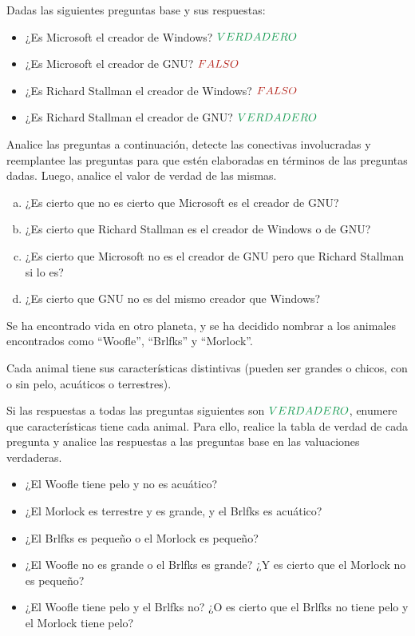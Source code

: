 \begin{exercise}
    Dadas las siguientes preguntas base y sus respuestas:
    \begin{itemize}
        \item ¿Es Microsoft el creador de Windows? $\ltruefull$
        \item ¿Es Microsoft el creador de GNU? $\lfalsefull$
        \item ¿Es Richard Stallman el creador de Windows? $\lfalsefull$
        \item ¿Es Richard Stallman el creador de GNU? $\ltruefull$
    \end{itemize}

    Analice las preguntas a continuación, detecte las conectivas involucradas y
    reemplantee las preguntas para que estén elaboradas en términos de las
    preguntas dadas. Luego, analice el valor de verdad de las mismas.

    \begin{enumerate}[a)]
        \item ¿Es cierto que no es cierto que Microsoft es el creador de GNU?
        \item ¿Es cierto que Richard Stallman es el creador de Windows o de GNU?
        \item ¿Es cierto que Microsoft no es el creador de GNU pero que Richard
        Stallman si lo es?
        \item ¿Es cierto que GNU no es del mismo creador que Windows?
    \end{enumerate}
\end{exercise}

\begin{exercise}
    Se ha encontrado vida en otro planeta, y se ha decidido nombrar a los animales
    encontrados como ``Woofle'', ``Brlfks'' y ``Morlock''.

    Cada animal tiene sus características distintivas (pueden ser grandes o chicos,
    con o sin pelo, acuáticos o terrestres).

    Si las respuestas a todas las preguntas siguientes son $\ltruefull$, enumere que
    características tiene cada animal. Para ello, realice la tabla de verdad de
    cada pregunta y analice las respuestas a las preguntas base en las valuaciones
    verdaderas.

    \begin{itemize}
      \item ¿El Woofle tiene pelo y no es acuático?
      \item ¿El Morlock es terrestre y es grande, y el Brlfks es acuático?
      \item ¿El Brlfks es pequeño o el Morlock es pequeño?
      \item ¿El Woofle no es grande o el Brlfks es grande? ¿Y es cierto que el Morlock no es pequeño?
      \item ¿El Woofle tiene pelo y el Brlfks no? ¿O es cierto que el Brlfks no tiene pelo y el Morlock tiene pelo?
    \end{itemize}
\end{exercise}